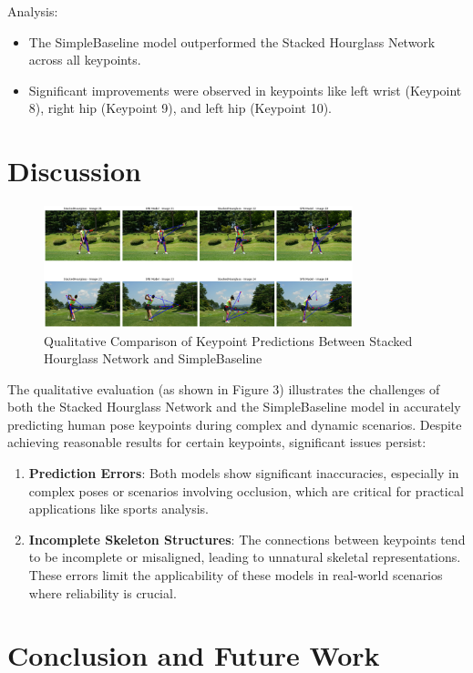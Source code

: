 \documentclass{article}
\begin{document}
Analysis:
\begin{itemize}
\item The SimpleBaseline model outperformed the Stacked Hourglass Network across all keypoints.
\item   Significant improvements were observed in keypoints like left wrist (Keypoint 8), right hip (Keypoint 9), and left hip (Keypoint 10).
\end{itemize}

\section{Discussion}
\begin{figure}[htbp]
    \centering
    \includegraphics[width=0.8\textwidth]{figure3.png}
    \caption{Qualitative Comparison of Keypoint Predictions Between Stacked Hourglass Network and SimpleBaseline}
    \label{fig:keypoint_presictions}
\end{figure}

The qualitative evaluation (as shown in Figure 3) illustrates the challenges of both the Stacked Hourglass Network and the SimpleBaseline model in accurately predicting human pose keypoints during complex and dynamic scenarios. Despite achieving reasonable results for certain keypoints, significant issues persist: 
\begin{enumerate}
    \item \textbf{Prediction Errors}: Both models show significant inaccuracies, especially in complex poses or scenarios involving occlusion, which are critical for practical applications like sports analysis. 
    \item \textbf{Incomplete Skeleton Structures}: The connections between keypoints tend to be incomplete or misaligned, leading to unnatural skeletal representations. These errors limit the applicability of these models in real-world scenarios where reliability is crucial. 
    \end{enumerate}

\section{Conclusion and Future Work}
\end{document}
